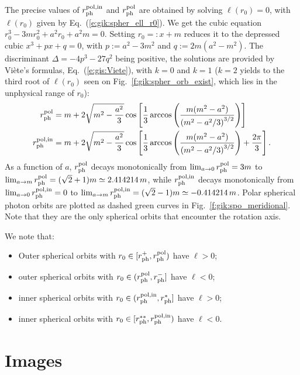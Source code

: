 The precise values of $r_{\rm ph}^{\rm pol,in}$ and
$r_{\rm ph}^{\rm pol}$ are obtained by solving $\ell(r_0) = 0$,
with $\ell(r_0)$ given by Eq.~(\ref{e:gik:spher_ell_r0}). We get the cubic
equation $r_0^3 - 3 m r_0^2 + a^2 r_0 + a^2 m = 0$. Setting $r_0 =: x + m$ reduces
it to the depressed cubic $x^3 + p x + q = 0$, with $p := a^2 - 3 m^2$
and $q := 2m (a^2 - m^2)$. The discriminant $\mathit{\Delta} = - 4 p^3 - 27 q^2$
being positive, the solutions are provided by Viète's formulas, Eq.~(\ref{e:gis:Viete}),
with $k=0$ and $k=1$ ($k=2$ yields to the third root of $\ell(r_0)$ seen on
Fig.~\ref{f:gik:spher_orb_exist}, which lies
in the unphysical range of $r_0$):
\begin{subequations}
\begin{align}
    r_{\rm ph}^{\rm pol} & = m + 2 \sqrt{m^2 - \frac{a^2}{3}}
        \cos\left[ \frac{1}{3}\arccos \left(
        \frac{m(m^2 - a^2)}{\left( m^2 - {a^2}/{3} \right) ^{3/2}} \right) \right] \\
    r_{\rm ph}^{\rm pol,in} & = m + 2 \sqrt{m^2 - \frac{a^2}{3}}
        \cos\left[ \frac{1}{3}\arccos \left(
        \frac{m(m^2 - a^2)}{\left( m^2 - {a^2}/{3} \right) ^{3/2}} \right) + \frac{2\pi}{3} \right] .
\end{align}
\end{subequations}
As a function of $a$, $r_{\rm ph}^{\rm pol}$ decays monotonically from
$\lim_{a\to 0} r_{\rm ph}^{\rm pol} = 3 m$ to
$\lim_{a\to m} r_{\rm ph}^{\rm pol} = (\sqrt{2} + 1) m \simeq 2.414214\, m$,
while $r_{\rm ph}^{\rm pol,in}$ decays monotonically from
$\lim_{a\to 0} r_{\rm ph}^{\rm pol,in} = 0$ to
$\lim_{a\to m} r_{\rm ph}^{\rm pol,in} = (\sqrt{2} - 1) m \simeq -0.414214\, m$.
Polar spherical photon orbits are plotted as dashed green curves in Fig.~\ref{f:gik:spo_meridional}.
Note that they are the only spherical orbits that encounter the rotation axis.


We note that:
\begin{greybox}
\begin{itemize}
\item Outer spherical orbits with $r_0 \in [r_{\rm ph}^+, r_{\rm ph}^{\rm pol})$ %
have $\ell > 0$;
\item outer spherical orbits with $r_0 \in (r_{\rm ph}^{\rm pol}, r_{\rm ph}^-]$ %
have $\ell < 0$;
\item inner spherical orbits with $r_0 \in (r_{\rm ph}^{\rm pol,in}, r_{\rm ph}^*]$
have $\ell > 0$;
\item inner spherical orbits with $r_0 \in [r_{\rm ph}^{**}, r_{\rm ph}^{\rm pol,in})$ %
have $\ell < 0$.
\end{itemize}
\end{greybox}



\section{Images}

















